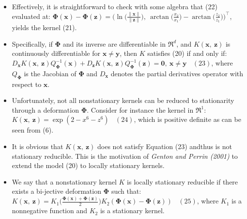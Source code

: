 \documentclass[
  ignorenonframetext,
]{beamer}
\begin{document}
\begin{frame}{}
\protect\hypertarget{section-17}{}
\begin{itemize}
\item
  Effectively, it is straightforward to check with some algebra that
  (22) evaluated at:
  \(\pmb\Phi(\pmb x) - \pmb\Phi(\pmb z) = \bigg( \ln\Big(\frac {\|\pmb x\|}{\|\pmb z\|}\Big),\ \arctan \big(\frac {x_2} {x_1}\big) - \arctan\big(\frac {z_2} {z_1}\big) \bigg)^{\top}\),
  yields the kernel (21).
\item
  Specifically, if \(\pmb \Phi\) and its inverse are differentiable in
  \(\mathfrak R^d\), and \(K(\pmb x,\ \pmb z)\) is continuously
  differentiable for \(\pmb x \neq \pmb y\), then \(K\) satisfies (20)
  if and only if:
  \(D_{\pmb x}K(\pmb x,\ \pmb z)Q^{-1}_{\pmb \Phi}(\pmb x) + D_{\pmb z}K(\pmb x,\ \pmb z)Q^{-1}_{\pmb \Phi} (\pmb z) = \pmb 0,\ \pmb x \neq \pmb y \ \ \ \ (23)\),
  where \(Q_{\pmb \Phi}\) is the Jacobian of \(\pmb \Phi\) and
  \(D_{\pmb x}\) denotes the partial derivatives operator with respect
  to \(\pmb x\).
\end{itemize}
\end{frame}

\begin{frame}{}
\protect\hypertarget{section-18}{}
\begin{itemize}
\item
  Unfortunately, not all nonstationary kernels can be reduced to
  stationarity through a deformation \(\pmb \Phi\). Consider for
  instance the kernel in \(\mathfrak R^1\):
  \(K(\pmb x,\ \pmb z) = \exp(2-x^6-z^6) \ \ \ \ (24)\), which is
  positive definite as can be seen from (6).
\item
  It is obvious that \(K(\pmb x,\ \pmb z)\) does not satisfy Equation
  (23) andthus is not stationary reducible. This is the motivation of
  \emph{Genton and Perrin (2001)} to extend the model (20) to locally
  stationary kernels.
\item
  We say that a nonstationary kernel \(K\) is locally stationary
  reducible if there exists a bi-jective deformation \(\pmb \Phi\) such
  that:
  \(K(\pmb x,\ \pmb z) = K_1\Big(\frac {\pmb\Phi(\pmb x) + \pmb\Phi(\pmb z)} 2\Big) K_2 (\pmb\Phi(\pmb x) - \pmb\Phi(\pmb z)) \ \ \ \ (25)\),
  where \(K_1\) is a nonnegative function and \(K_2\) is a stationary
  kernel.
\end{itemize}
\end{frame}
\end{document}
